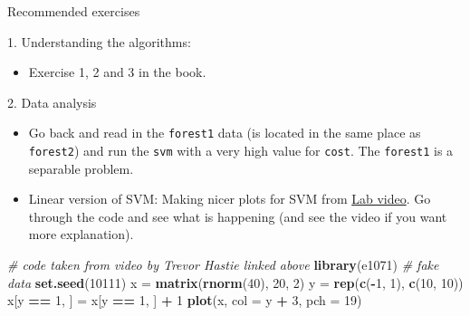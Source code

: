 \documentclass[ignorenonframetext,]{beamer}
\newenvironment{Shaded}{\begin{snugshade}}{\end{snugshade}}
\newcommand{\KeywordTok}[1]{\textcolor[rgb]{0.13,0.29,0.53}{\textbf{#1}}}
\newcommand{\DataTypeTok}[1]{\textcolor[rgb]{0.13,0.29,0.53}{#1}}
\newcommand{\DecValTok}[1]{\textcolor[rgb]{0.00,0.00,0.81}{#1}}
\newcommand{\StringTok}[1]{\textcolor[rgb]{0.31,0.60,0.02}{#1}}
\newcommand{\CommentTok}[1]{\textcolor[rgb]{0.56,0.35,0.01}{\textit{#1}}}
\newcommand{\OperatorTok}[1]{\textcolor[rgb]{0.81,0.36,0.00}{\textbf{#1}}}
\newcommand{\NormalTok}[1]{#1}
\providecommand{\tightlist}{%
  \setlength{\itemsep}{0pt}\setlength{\parskip}{0pt}}
\begin{document}
\begin{frame}[fragile]{Recommended exercises}

\begin{block}{1. Understanding the algorithms:}

\begin{itemize}
\tightlist
\item
  Exercise 1, 2 and 3 in the book.
\end{itemize}

\end{block}

\begin{block}{2. Data analysis}

\begin{itemize}
\item
  Go back and read in the \texttt{forest1} data (is located in the same
  place as \texttt{forest2}) and run the \texttt{svm} with a very high
  value for \texttt{cost}. The \texttt{forest1} is a separable problem.
\item
  Linear version of SVM: Making nicer plots for SVM from
  \href{https://www.youtube.com/watch?v=qhyyufR0930\&list=PL5-da3qGB5IDl6MkmovVdZwyYOhpCxo5o\&index=5}{Lab
  video}. Go through the code and see what is happening (and see the
  video if you want more explanation).
\end{itemize}

\begin{Shaded}
\begin{Highlighting}[]
\CommentTok{# code taken from video by Trevor Hastie linked above}
\KeywordTok{library}\NormalTok{(e1071)}
\CommentTok{# fake data}
\KeywordTok{set.seed}\NormalTok{(}\DecValTok{10111}\NormalTok{)}
\NormalTok{x =}\StringTok{ }\KeywordTok{matrix}\NormalTok{(}\KeywordTok{rnorm}\NormalTok{(}\DecValTok{40}\NormalTok{), }\DecValTok{20}\NormalTok{, }\DecValTok{2}\NormalTok{)}
\NormalTok{y =}\StringTok{ }\KeywordTok{rep}\NormalTok{(}\KeywordTok{c}\NormalTok{(}\OperatorTok{-}\DecValTok{1}\NormalTok{, }\DecValTok{1}\NormalTok{), }\KeywordTok{c}\NormalTok{(}\DecValTok{10}\NormalTok{, }\DecValTok{10}\NormalTok{))}
\NormalTok{x[y }\OperatorTok{==}\StringTok{ }\DecValTok{1}\NormalTok{, ] =}\StringTok{ }\NormalTok{x[y }\OperatorTok{==}\StringTok{ }\DecValTok{1}\NormalTok{, ] }\OperatorTok{+}\StringTok{ }\DecValTok{1}
\KeywordTok{plot}\NormalTok{(x, }\DataTypeTok{col =}\NormalTok{ y }\OperatorTok{+}\StringTok{ }\DecValTok{3}\NormalTok{, }\DataTypeTok{pch =} \DecValTok{19}\NormalTok{)}
\end{Highlighting}
\end{Shaded}


\end{block}
\end{frame}
\end{document}
